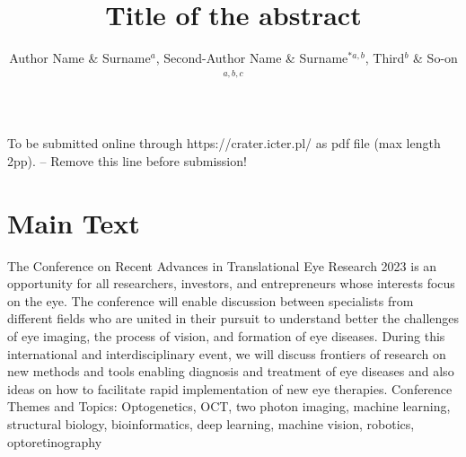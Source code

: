 \documentclass[10pt, twoside, a4paper]{article}
\begin{document}
{
    \fancyhead{}
   
}

\thispagestyle{firststyle}
\fancyhf{}
\renewcommand{\headrulewidth}{0pt}
\renewcommand{\footrulewidth}{0pt}
\renewcommand{\footskip}{50pt}

\pagestyle{fancy}

{\vspace*{3mm}\color{color_261472}\fontsize{10}{10.5}\selectfont To be submitted online through https://crater.icter.pl/ as pdf file (max length 2pp). -- Remove this line before submission!}



\title{Title of the abstract}


\author{
Author Name \& Surname$^{a}$, Second-Author Name \& Surname$^{\ast a,b}$, Third$^{b}$ \& So-on$^{a,b,c}$
}

\address{
    $^{a}$Institution, address, Country \\
    $^{b}$Institution, address, Country \\
    $^{c}$Institution, address, Country \\
    $^{\#}$corresponding author email:  author@author.com \\
    $^{\ast}$Presenting author
	}


\section{Main Text}
The Conference on Recent Advances in Translational Eye Research 2023 is an opportunity for all researchers, investors, and entrepreneurs whose interests focus on the eye.
The conference will enable discussion between specialists from different fields who are united in their pursuit to understand better the challenges of eye imaging, the process of vision, and formation of eye diseases.
During this international and interdisciplinary event, we will discuss frontiers of research on new methods and tools enabling diagnosis and treatment of eye diseases and also ideas on how to facilitate rapid implementation of new eye therapies.
Conference Themes and Topics: Optogenetics, OCT, two photon imaging, machine learning, structural biology, bioinformatics, deep learning, machine vision, robotics, optoretinography
\end{document}
